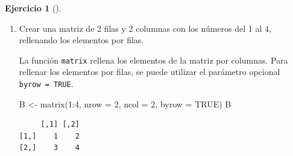 \documentclass[
  a4paper,
]{scrreport}
\newenvironment{Shaded}{\begin{snugshade}}{\end{snugshade}}
\newcommand{\AttributeTok}[1]{\textcolor[rgb]{0.40,0.45,0.13}{#1}}
\newcommand{\ConstantTok}[1]{\textcolor[rgb]{0.56,0.35,0.01}{#1}}
\newcommand{\DecValTok}[1]{\textcolor[rgb]{0.68,0.00,0.00}{#1}}
\newcommand{\FunctionTok}[1]{\textcolor[rgb]{0.28,0.35,0.67}{#1}}
\newcommand{\NormalTok}[1]{\textcolor[rgb]{0.00,0.23,0.31}{#1}}
\newcommand{\OtherTok}[1]{\textcolor[rgb]{0.00,0.23,0.31}{#1}}
\newcommand{\SpecialCharTok}[1]{\textcolor[rgb]{0.37,0.37,0.37}{#1}}
\theoremstyle{definition}
\newtheorem{exercise}{Ejercicio}[chapter]
\theoremstyle{remark}
\begin{document}
\begin{exercise}[]
\begin{enumerate}
\begin{tcolorbox}
  La función \texttt{cbind(matriz,\ vector)} permite añadir una nueva
  columna a la matriz \texttt{matriz} con los datos de \texttt{vector}.

\begin{Shaded}
\begin{Highlighting}[]
\NormalTok{A }\OtherTok{\textless{}{-}} \FunctionTok{cbind}\NormalTok{(A, }\DecValTok{5}\SpecialCharTok{:}\DecValTok{6}\NormalTok{)}
\NormalTok{A}
\end{Highlighting}
\end{Shaded}

\begin{verbatim}
     [,1] [,2] [,3]
[1,]    1    3    5
[2,]    2    4    6
\end{verbatim}

  \end{tcolorbox}
\item
  Crear una matriz de 2 filas y 2 columnas con los números del 1 al 4,
  rellenando los elementos por filas.

  \begin{tcolorbox}[enhanced jigsaw, colframe=quarto-callout-tip-color-frame, toprule=.15mm, bottomtitle=1mm, breakable, opacitybacktitle=0.6, toptitle=1mm, colback=white, bottomrule=.15mm, title=\textcolor{quarto-callout-tip-color}{\faLightbulb}\hspace{0.5em}{Solución}, arc=.35mm, left=2mm, titlerule=0mm, rightrule=.15mm, coltitle=black, leftrule=.75mm, opacityback=0, colbacktitle=quarto-callout-tip-color!10!white]

  La función \texttt{matrix} rellena los elementos de la matriz por
  columnas. Para rellenar los elementos por filas, se puede utilizar el
  parámetro opcional \texttt{byrow\ =\ TRUE}.

\begin{Shaded}
\begin{Highlighting}[]
\NormalTok{B }\OtherTok{\textless{}{-}} \FunctionTok{matrix}\NormalTok{(}\DecValTok{1}\SpecialCharTok{:}\DecValTok{4}\NormalTok{, }\AttributeTok{nrow =} \DecValTok{2}\NormalTok{, }\AttributeTok{ncol =} \DecValTok{2}\NormalTok{, }\AttributeTok{byrow =} \ConstantTok{TRUE}\NormalTok{)}
\NormalTok{B}
\end{Highlighting}
\end{Shaded}

\begin{verbatim}
     [,1] [,2]
[1,]    1    2
[2,]    3    4
\end{verbatim}


\end{tcolorbox}
\end{enumerate}
\end{exercise}
\end{document}
